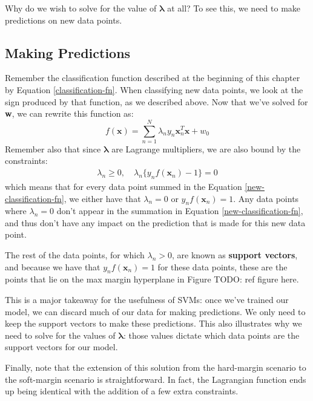 Why do we wish to solve for the value of $\boldsymbol{\lambda}$ at all? To see this, we need to make predictions on new data points.

\subsection{Making Predictions}
Remember the classification function described at the beginning of this chapter by Equation \ref{classification-fn}. When classifying new data points, we look at the sign produced by that function, as we described above. Now that we've solved for \textbf{w}, we can rewrite this function as:
\begin{equation} \label{new-classification-fn}
	f(\textbf{x}) = \sum_{n=1}^{N} \lambda_{n} y_{n} \textbf{x}_{n}^{T} \textbf{x} + w_{0}
\end{equation}
Remember also that since $\boldsymbol{\lambda}$ are Lagrange multipliers, we are also bound by the constraints:
\begin{align*}
	\lambda_{n} \geq 0, \quad \lambda_{n} \{y_{n} f(\textbf{x}_{n}) - 1\} = 0
\end{align*}
which means that for every data point summed in the Equation \ref{new-classification-fn}, we either have that $\lambda_{n} = 0$ or $y_{n} f(\textbf{x}_{n}) = 1$. Any data points where $\lambda_{n} = 0$ don't appear in the summation in Equation \ref{new-classification-fn}, and thus don't have any impact on the prediction that is made for this new data point. \newline

The rest of the data points, for which $\lambda_{n} > 0$, are known as \textbf{support vectors}, and because we have that $y_{n} f(\textbf{x}_{n}) = 1$ for these data points, these are the points that lie on the max margin hyperplane in Figure TODO: ref figure here.

This is a major takeaway for the usefulness of SVMs: once we've trained our model, we can discard much of our data for making predictions. We only need to keep the support vectors to make these predictions. This also illustrates why we need to solve for the values of $\boldsymbol{\lambda}$: those values dictate which data points are the support vectors for our model.

Finally, note that the extension of this solution from the hard-margin scenario to the soft-margin scenario is straightforward. In fact, the Lagrangian function ends up being identical with the addition of a few extra constraints.


